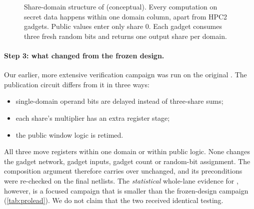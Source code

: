 \begin{figure}[t]\centering
{}
\caption{Share-domain structure of \PAMS{} (conceptual). Every computation on secret data happens within one domain column, apart from HPC2 gadgets. Public values enter only share 0. Each gadget consumes three fresh random bits and returns one output share per domain.}\label{fig:domains}
\end{figure}

\paragraph{Step 3: what changed from the frozen design.}
Our earlier, more extensive verification campaign was run on the original . The publication circuit  differs from it in three ways:
\begin{itemize}
  \item single-domain operand bits are delayed instead of three-share sums;
  \item each share's multiplier has an extra register stage;
  \item the public window logic is retimed.
\end{itemize}
All three move registers within one domain or within public logic. None changes the gadget network, gadget inputs, gadget count or random-bit assignment. The composition argument therefore carries over unchanged, and its preconditions were re-checked on the final netlists. The \emph{statistical} whole-lane evidence for , however, is a focused campaign that is smaller than the frozen-design campaign (\cref{tab:prolead}). We do not claim that the two received identical testing.

